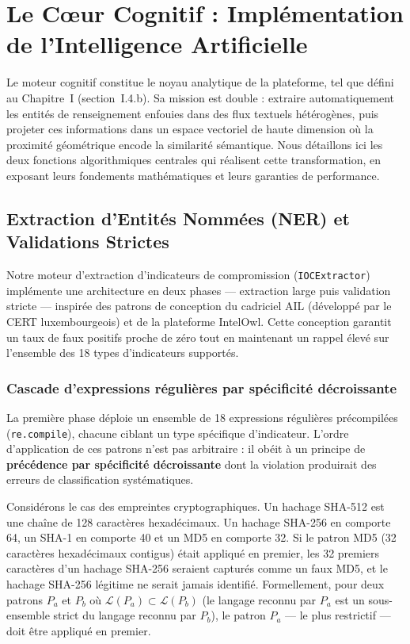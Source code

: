 
\section{Le C\oe ur Cognitif : Implémentation de l'Intelligence Artificielle}

Le moteur cognitif constitue le noyau analytique de la plateforme, tel que défini au Chapitre~I (section~I.4.b). Sa mission est double : extraire automatiquement les entités de renseignement enfouies dans des flux textuels hétérogènes, puis projeter ces informations dans un espace vectoriel de haute dimension où la proximité géométrique encode la similarité sémantique. Nous détaillons ici les deux fonctions algorithmiques centrales qui réalisent cette transformation, en exposant leurs fondements mathématiques et leurs garanties de performance.

\subsection{Extraction d'Entités Nommées (NER) et Validations Strictes}

Notre moteur d'extraction d'indicateurs de compromission (\texttt{IOCExtractor}) implémente une architecture en deux phases --- extraction large puis validation stricte --- inspirée des patrons de conception du cadriciel AIL (développé par le CERT luxembourgeois) et de la plateforme IntelOwl. Cette conception garantit un taux de faux positifs proche de zéro tout en maintenant un rappel élevé sur l'ensemble des 18 types d'indicateurs supportés.

\subsubsection{Cascade d'expressions régulières par spécificité décroissante}

La première phase déploie un ensemble de 18 expressions régulières précompilées (\texttt{re.compile}), chacune ciblant un type spécifique d'indicateur. L'ordre d'application de ces patrons n'est pas arbitraire : il obéit à un principe de \textbf{précédence par spécificité décroissante} dont la violation produirait des erreurs de classification systématiques.

Considérons le cas des empreintes cryptographiques. Un hachage SHA-512 est une chaîne de 128 caractères hexadécimaux. Un hachage SHA-256 en comporte 64, un SHA-1 en comporte 40 et un MD5 en comporte 32. Si le patron MD5 (32 caractères hexadécimaux contigus) était appliqué en premier, les 32 premiers caractères d'un hachage SHA-256 seraient capturés comme un faux MD5, et le hachage SHA-256 légitime ne serait jamais identifié. Formellement, pour deux patrons $P_a$ et $P_b$ où $\mathcal{L}(P_a) \subset \mathcal{L}(P_b)$ (le langage reconnu par $P_a$ est un sous-ensemble strict du langage reconnu par $P_b$), le patron $P_a$ --- le plus restrictif --- doit être appliqué en premier.

